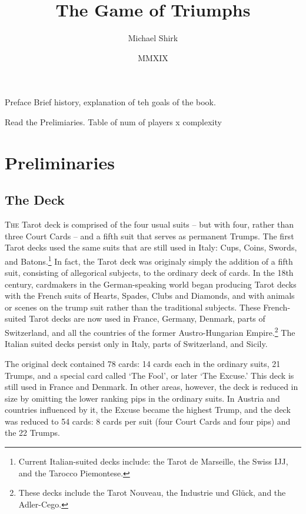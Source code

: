 \documentclass[ebook,12pt,twoside,openright,extrafontsizes,final]{memoir}
\begin{document}
\frontmatter
\title{The Game of Triumphs}
\author{Michael Shirk}
\date{MMXIX}
\maketitle

\tableofcontents


Preface
Brief history,
explanation of teh goals of the book.

Read the Prelimiaries. 
Table of num of players x complexity

\mainmatter

\chapter{Preliminaries}
\section{The Deck}
\lettrine{T}{he} Tarot deck is comprised of the four usual suits – but with four, rather
than three Court Cards – and a fifth suit that serves as permanent Trumps.
The first Tarot decks used the same suits that are still used in Italy:
Cups, Coins, Swords, and Batons.\footnote{Current Italian-suited decks include:
the Tarot de Marseille, the Swiss IJJ, and the Tarocco Piemontese.}  In fact,
the Tarot deck was originaly simply the addition of a fifth suit, consisting 
of allegorical subjects, to the ordinary deck of cards.  In the 18th century, 
cardmakers in the German-speaking world began producing Tarot decks with the French suits
of Hearts, Spades, Clubs and Diamonds, and with animals or scenes on the
trump suit rather than the traditional subjects. These French-suited
Tarot decks are now used in France, Germany, Denmark, parts of Switzerland, 
and all the countries of the former Austro-Hungarian Empire.\footnote{These
decks include the Tarot Nouveau, the Industrie und Glück, and the Adler-Cego.}
The Italian suited decks persist only in Italy, parts of Switzerland, and Sicily.

The original deck contained 78 cards: 14 cards each in the ordinary suits, 
21 Trumps, and a special card called ‘The Fool’, or later ‘The Excuse.’
This deck is still used in France and Denmark.  In other areas, however,
the deck is reduced in size by omitting the lower ranking pips in the ordinary
suits. In Austria and countries influenced by it, the Excuse became the highest
Trump, and the deck was reduced to 54 cards: 8 cards per suit (four Court Cards 
and four pips) and the 22 Trumps.
\end{document}
